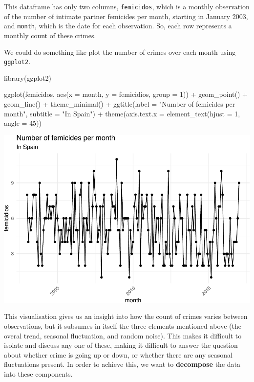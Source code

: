 \documentclass[
]{book}
\newenvironment{Shaded}{\begin{snugshade}}{\end{snugshade}}
\newcommand{\AttributeTok}[1]{\textcolor[rgb]{0.77,0.63,0.00}{#1}}
\newcommand{\DecValTok}[1]{\textcolor[rgb]{0.00,0.00,0.81}{#1}}
\newcommand{\FunctionTok}[1]{\textcolor[rgb]{0.00,0.00,0.00}{#1}}
\newcommand{\NormalTok}[1]{#1}
\newcommand{\SpecialCharTok}[1]{\textcolor[rgb]{0.00,0.00,0.00}{#1}}
\newcommand{\StringTok}[1]{\textcolor[rgb]{0.31,0.60,0.02}{#1}}
\begin{document}
This dataframe has only two columns, \texttt{femicidos}, which is a monthly observation of the number of intimate partner femicides per month, starting in January 2003, and \texttt{month}, which is the date for each observation. So, each row represents a monthly count of these crimes.

We could do something like plot the number of crimes over each month using \texttt{ggplot2}.

\begin{Shaded}
\begin{Highlighting}[]
\FunctionTok{library}\NormalTok{(ggplot2)}

\FunctionTok{ggplot}\NormalTok{(femicidos, }\FunctionTok{aes}\NormalTok{(}\AttributeTok{x =}\NormalTok{ month, }\AttributeTok{y =}\NormalTok{ femicidios, }\AttributeTok{group =} \DecValTok{1}\NormalTok{)) }\SpecialCharTok{+} 
  \FunctionTok{geom\_point}\NormalTok{() }\SpecialCharTok{+} 
  \FunctionTok{geom\_line}\NormalTok{() }\SpecialCharTok{+} 
  \FunctionTok{theme\_minimal}\NormalTok{() }\SpecialCharTok{+} 
  \FunctionTok{ggtitle}\NormalTok{(}\AttributeTok{label =} \StringTok{"Number of femicides per month"}\NormalTok{, }\AttributeTok{subtitle =} \StringTok{"In Spain"}\NormalTok{) }\SpecialCharTok{+} 
  \FunctionTok{theme}\NormalTok{(}\AttributeTok{axis.text.x =} \FunctionTok{element\_text}\NormalTok{(}\AttributeTok{hjust =} \DecValTok{1}\NormalTok{, }\AttributeTok{angle =} \DecValTok{45}\NormalTok{))}
\end{Highlighting}
\end{Shaded}

\includegraphics{crime_mapping_files/figure-latex/ggplottime-1.pdf}

This visualisation gives us an insight into how the count of crimes varies between observations, but it subsumes in itself the three elements mentioned above (the overal trend, seasonal fluctuation, and random noise). This makes it difficult to isolate and discuss any one of these, making it difficult to answer the question about whether crime is going up or down, or whether there are any seasonal fluctuations present. In order to achieve this, we want to \textbf{decompose} the data into these components.
\end{document}
